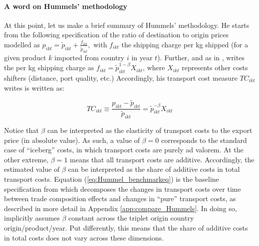 \documentclass[a4paper,11pt]{article}
\begin{document}
\paragraph{A word on Hummels' methodology} At this point, let us make a brief summary of Hummels' methodology\nocite{hummels2007}.
He starts from the following specification of the ratio of destination to origin prices modelled as $p_{ikt} = \widetilde{p}_{ikt}+\frac{f_{ikt}}{ \widetilde{p}_{ikt}},$ with $f_{ikt}$ the shipping charge per kg shipped (for a given product $k$ imported from country $i$ in year $t$).
Further, and as in \cite{hummels_skiba}, \cite{hummels2007} writes the per kg shipping charge as $f_{ikt}=\widetilde{p}_{ikt}^{1-\beta}X_{ikt}$, where $X_{ikt}$ represents other costs shifters (distance, port quality, etc.) Accordingly, his transport cost measure $TC_{ikt}$ writes is written as:

\begin{equation}
TC_{ikt}\equiv \frac{p_{ikt}-\widetilde{p}_{ikt}}{\widetilde{p}_{ikt}} = \widetilde{p}_{ikt}^{-\beta}X_{ikt} \label{eq:Hummel_benchmarkeq}
\end{equation}

Notice that $\beta$ can be interpreted as the elasticity of transport costs to the export price (in absolute value).
As such, a value of $\beta = 0$ corresponds to the standard case of ``iceberg'' costs, in which transport costs are purely ad valorem.
At the other extreme, $\beta = 1$ means that all transport costs are additive.
Accordingly, the estimated value of $\beta$ can be interpreted as the share of additive costs in total transport costs.
Equation (\ref{eq:Hummel_benchmarkeq}) is the baseline specification from which \cite{hummels2007} decomposes the changes in transport costs over time between trade composition effects and changes in ``pure'' transport costs, as described in more detail in Appendix \ref{app:compare_Hummels}.
In doing so, \cite{hummels2007} implicitly assumes $\beta$ constant across the triplet origin country origin/product/year.
Put differently, this means that the share of additive costs in total costs does not vary across these dimensions.
\end{document}
